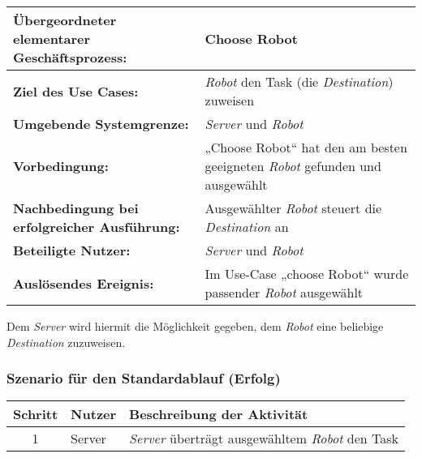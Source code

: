 			\begin{table}[H]
				\centering
				\begin{tabularx}{\textwidth}{@{}p{5cm}X@{}}
				\hline
				\textbf{Übergeordneter elementarer Geschäftsprozess:} & Choose Robot  \\ \hline
				\textbf{Ziel des Use Cases:} & \emph{Robot} den Task (die \emph{Destination}) zuweisen\\ \hline
				\textbf{Umgebende Systemgrenze:} & \emph{Server} und \emph{Robot} \\ \hline
				\textbf{Vorbedingung:} & „Choose Robot“ hat den am besten geeigneten \emph{Robot} gefunden und ausgewählt\\ \hline
				\textbf{Nachbedingung bei erfolgreicher Ausführung:} & Ausgewählter \emph{Robot} steuert die \emph{Destination} an\\ \hline
				\textbf{Beteiligte Nutzer:} & \emph{Server} und \emph{Robot}\\ \hline
				\textbf{Auslösendes Ereignis:} & Im Use-Case „choose Robot“ wurde passender \emph{Robot} ausgewählt\\
				\hline
				\end{tabularx}
			\end{table}
			
			Dem \emph{Server} wird hiermit die Möglichkeit gegeben, dem \emph{Robot} eine beliebige \emph{Destination} zuzuweisen. 

			\subsubsection*{Szenario für den Standardablauf (Erfolg)}

			\begin{table}[H]
				\centering
				\begin{tabularx}{\textwidth}{@{}cp{2cm}X@{}}
				\hline
				Schritt & Nutzer & Beschreibung der Aktivität \\ \hline
				1 & Server & \emph{Server} überträgt ausgewähltem \emph{Robot} den Task \\
				\hline
				\end{tabularx}
			\end{table}


	\pagebreak


